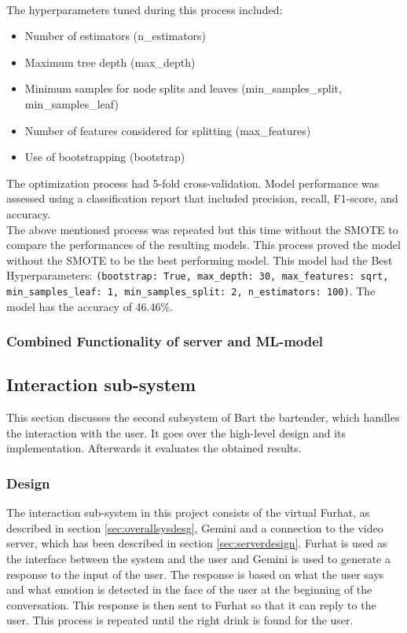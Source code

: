 \documentclass[conference]{IEEEtran}
\begin{document}
\\
The hyperparameters tuned during this process included:
\begin{itemize}
    \item Number of estimators (n\_estimators)
	\item Maximum tree depth (max\_depth)
	\item Minimum samples for node splits and leaves (min\_samples\_split, min\_samples\_leaf)
	\item Number of features considered for splitting (max\_features)
	\item Use of bootstrapping (bootstrap)
\end{itemize}	
    
The optimization process had 5-fold cross-validation.
Model performance was assessed using a classification report that included precision, recall, F1-score, and accuracy.
\\The above mentioned process was repeated but this time without the SMOTE to compare the performances of the resulting models. This process proved the model without the SMOTE to be the best performing model. This model had the Best Hyperparameters: 
\texttt{(bootstrap: True, max\_depth: 30, max\_features: sqrt, min\_samples\_leaf: 1, min\_samples\_split: 2, n\_estimators: 100)}. The model has the accuracy of 46.46\%.\\

\subsubsection{Combined Functionality of server and ML-model}

\subsection{Interaction sub-system} %
This section discusses the second subsystem of Bart the bartender, which handles the interaction with the user. 
It goes over the high-level design and its implementation. 
Afterwards it evaluates the obtained results.

\subsubsection{Design}
The interaction sub-system in this project consists of the virtual Furhat, as described in section \ref{sec:overallsysdesg}, Gemini and a connection to the video server, which has been described in section \ref{sec:serverdesign}.
Furhat is used as the interface between the system and the user and Gemini is used to generate a response to the input of the user.
The response is based on what the user says and what emotion is detected in the face of the user at the beginning of the conversation.
This response is then sent to Furhat so that it can reply to the user.
This process is repeated until the right drink is found for the user.
\end{document}
